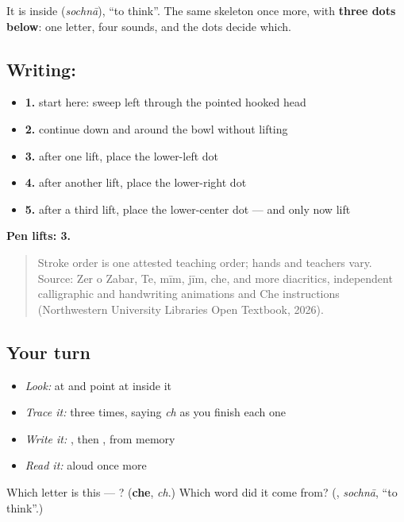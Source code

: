 It is inside \textbf{} (\emph{sochnā}), \textquotedblleft{}to think\textquotedblright{}. The same skeleton once more, with \textbf{three dots below}: one letter, four sounds, and the dots decide which.

\subsection*{Writing: }

\begin{itemize}
\raggedright
  \item \textbf{1.} start here: sweep left through the pointed hooked head
  \item \textbf{2.} continue down and around the bowl without lifting
  \item \textbf{3.} after one lift, place the lower-left dot
  \item \textbf{4.} after another lift, place the lower-right dot
  \item \textbf{5.} after a third lift, place the lower-center dot — and only now lift
\end{itemize}

\textbf{Pen lifts: 3.}

\begin{quote}
Stroke order is one attested teaching order; hands and teachers vary. Source: Zer o Zabar, Te, mīm, jīm, che, and more diacritics, independent  calligraphic and handwriting animations and Che instructions (Northwestern University Libraries Open Textbook, 2026).
\end{quote}

\subsection*{Your turn}
\begin{itemize}
\raggedright
  \item \emph{Look:} at \textbf{} and point at  inside it
  \item \emph{Trace it:}  three times, saying \emph{ch} as you finish each one
  \item \emph{Write it:} , then , from memory
  \item \emph{Read it:} \textbf{} aloud once more
\end{itemize}

\begin{tcolorbox}[breakable,colback=teal!4,colframe=teal!35!black,title={Before you move on}]
Which letter is this — ? (\textbf{che}, \emph{ch}.) Which word did it come from? (\textbf{}, \emph{sochnā}, \textquotedblleft{}to think\textquotedblright{}.)
\end{tcolorbox}
